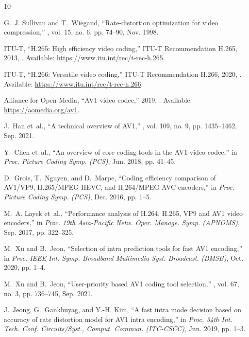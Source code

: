 \documentclass{article}
\begin{document}
\begin{thebibliography}{10}

G.~J. Sullivan and T.~Wiegand,
\newblock ``Rate-distortion optimization for video compression,''
, vol. 15, no. 6, pp. 74--90, Nov.
  1998.

{ITU-T},
\newblock ``{H.265}: High efficiency video coding,'' {ITU-T} Recommendation
  {H.265}, 2013,
\newblock [Online]. Available: \url{https://www.itu.int/rec/t-rec-h.265}.

{ITU-T},
\newblock ``{H.266}: Versatile video coding,'' {ITU-T} Recommendation {H.266},
  2020,
\newblock [Online]. Available: \url{https://www.itu.int/rec/t-rec-h.266}.

{Alliance for Open Media},
\newblock ``{AV1} video codec,'' 2019,
\newblock [Online]. Available: \url{https://aomedia.org/av1}.

J.~Han et~al.,
\newblock ``A technical overview of {AV1},''
, vol. 109, no. 9, pp. 1435--1462, Sep. 2021.

Y.~Chen et~al.,
\newblock ``An overview of core coding tools in the {AV1} video codec,''
\newblock in {\em Proc. Picture Coding Symp. ({PCS})}, Jun. 2018, pp. 41--45.

D.~Grois, T.~Nguyen, and D.~Marpe,
\newblock ``Coding efficiency comparison of {AV1/VP9}, {H.265/MPEG-HEVC}, and
  {H.264/MPEG-AVC} encoders,''
\newblock in {\em Proc. Picture Coding Symp. ({PCS})}, Dec. 2016, pp. 1--5.

M.~A. Layek et~al.,
\newblock ``Performance analysis of {H.264}, {H.265}, {VP9} and {AV1} video
  encoders,''
\newblock in {\em Proc. 19th Asia-Pacific Netw. Oper. Manage. Symp.
  ({APNOMS})}, Sep. 2017, pp. 322--325.

M.~Xu and B.~Jeon,
\newblock ``Selection of intra prediction tools for fast {AV1} encoding,''
\newblock in {\em Proc. IEEE Int. Symp. Broadband Multimedia Syst. Broadcast.
  ({BMSB})}, Oct. 2020, pp. 1--4.

M.~Xu and B.~Jeon,
\newblock ``User-priority based {AV1} coding tool selection,''
, vol. 67, no. 3, pp. 736--745, Sep.
  2021.

J.~Jeong, G.~Gankhuyag, and Y.-H. Kim,
\newblock ``A fast intra mode decision based on accuracy of rate distortion
  model for {AV1} intra encoding,''
\newblock in {\em Proc. 34th Int. Tech. Conf. Circuits/Syst., Comput. Commun.
  ({ITC-CSCC})}, Jun. 2019, pp. 1--3.


\end{thebibliography}
\end{document}
